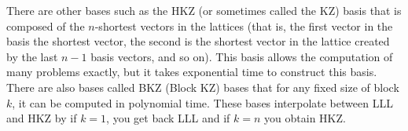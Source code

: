 \begin{center}
\end{center}

 There are other bases such as the HKZ (or sometimes called the KZ) basis that is composed of the $n$-shortest vectors in the lattices (that is, the first vector in the basis the shortest vector, the second is the shortest vector in the lattice created by the last $n-1$ basis vectors, and so on).  This basis allows the computation of many problems exactly, but it takes exponential time to construct this basis.  There are also bases called BKZ (Block KZ) bases that for any fixed size of block $k$, it can be computed in polynomial time.  These bases interpolate between LLL and HKZ by if $k=1$, you get back LLL and if $k=n$ you obtain HKZ.\\
%

